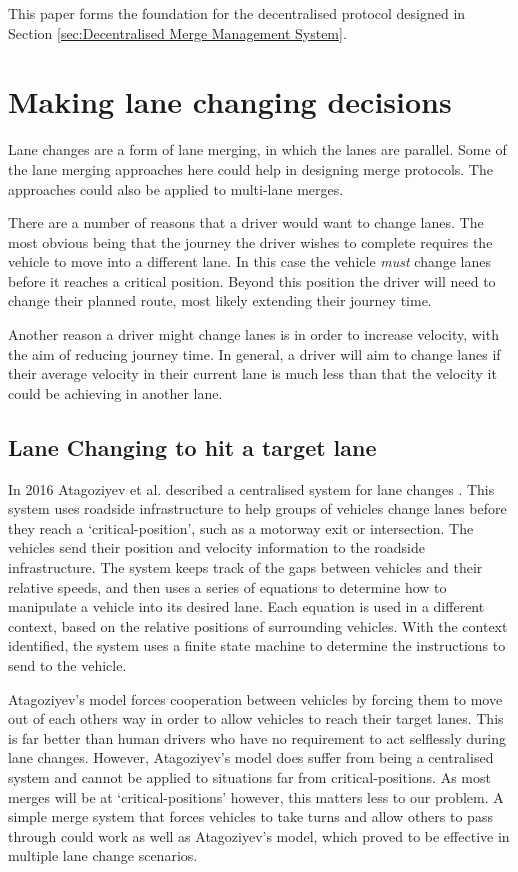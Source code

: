 This paper forms the foundation for the decentralised protocol designed in Section \ref{sec:Decentralised Merge Management System}.

\section{Making lane changing decisions}
\label{sec:Making lane changing decisions}
Lane changes are a form of lane merging, in which the lanes are parallel. Some of the lane merging approaches here could help in designing merge protocols. The approaches could also be applied to multi-lane merges.

There are a number of reasons that a driver would want to change lanes. The most obvious being that the journey the driver wishes to complete requires the vehicle to move into a different lane. In this case the vehicle \emph{must} change lanes before it reaches a critical position. Beyond this position the driver will need to change their planned route, most likely extending their journey time. 

Another reason a driver might change lanes is in order to increase velocity, with the aim of reducing journey time. In general, a driver will aim to change lanes if their average velocity in their current lane is much less than that the velocity it could be achieving in another lane.

\subsection{Lane Changing to hit a target lane}
\label{subsec:Lane Changing to hit a target lane}
In 2016 Atagoziyev et al. described a centralised system for lane changes \citep{Atagoziyev2016}. This system uses roadside infrastructure to help groups of vehicles change lanes before they reach a `critical-position', such as a motorway exit or intersection. The vehicles send their position and velocity information to the roadside infrastructure. The system keeps track of the gaps between vehicles and their relative speeds, and then uses a series of equations to determine how to manipulate a vehicle into its desired lane. Each equation is used in a different context, based on the relative positions of surrounding vehicles. With the context identified, the system uses a finite state machine to determine the instructions to send to the vehicle.

Atagoziyev's model forces cooperation between vehicles by forcing them to move out of each others way in order to allow vehicles to reach their target lanes. This is far better than human drivers who have no requirement to act selflessly during lane changes. However, Atagoziyev's model does suffer from being a centralised system and cannot be applied to situations far from critical-positions. As most merges will be at `critical-positions' however, this matters less to our problem. A simple merge system that forces vehicles to take turns and allow others to pass through could work as well as Atagoziyev's model, which proved to be effective in multiple lane change scenarios.

